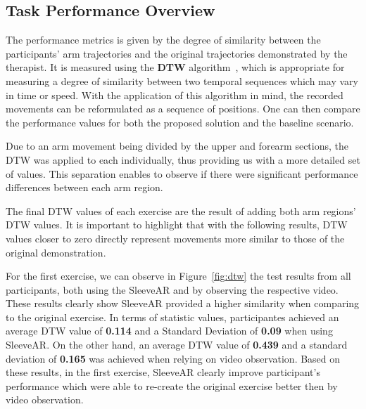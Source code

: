 \begin{table}[!t]
\centering
{}
\caption{Widgets Questionnaire}
\label{table:widgets}
\end{table}

\subsection{Task Performance Overview}


The performance metrics is given by the degree of similarity between the participants' arm trajectories and the original trajectories demonstrated by the therapist. 
It is measured using the \textbf{\ac{DTW}} algorithm~\cite{kruskal1983symmetric}, which is appropriate for measuring a degree of similarity between two temporal sequences which may vary in time or speed. 
With the application of this algorithm in mind, the recorded movements can be reformulated as a sequence of positions. One can then compare the performance values for both the proposed solution and the baseline scenario.

Due to an arm movement being divided by the upper and forearm sections, the \ac{DTW} was applied to each individually, thus providing us with a more detailed set of values. This separation enables to observe if there were significant performance differences between each arm region.

The final \ac{DTW} values of each exercise are the result of adding both arm regions' DTW values. It is important to highlight that with the following results, DTW values closer to zero directly represent movements more similar to those of the original demonstration.

For the first exercise, we can observe in Figure~\ref{fig:dtw} the test results from all participants, both using the SleeveAR and by observing the respective video.
These results clearly show SleeveAR provided a higher similarity when comparing to the original exercise. 
In terms of statistic values, participantes achieved an average \ac{DTW} value of \textbf{0.114} and a Standard Deviation of \textbf{0.09} when using SleeveAR.
On the other hand, an average \ac{DTW} value of \textbf{0.439} and a standard deviation of \textbf{0.165} was achieved when relying on video observation. 
Based on these results, in the first exercise, SleeveAR clearly improve participant's performance which were able to re-create the original exercise better then by video observation. 

